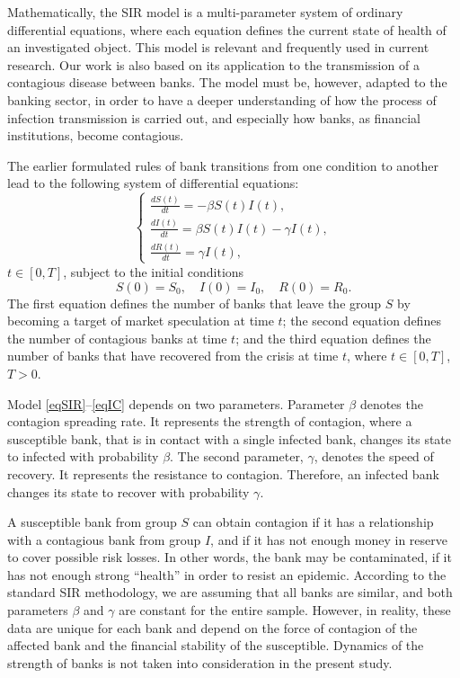 \documentclass[a4paper,10pt,twoside]{article}
\begin{document}
Mathematically, the SIR model is a multi-parameter system of ordinary differential equations,
where each equation defines the current state of health of an investigated object.
This model is relevant and frequently used in current research.
Our work is also based on its application to the transmission of a contagious disease between banks.
The model must be, however, adapted to the banking sector, 
in order to have a deeper understanding of how the process of infection transmission 
is carried out, and especially how banks, as financial institutions, become contagious.

The earlier formulated rules of bank transitions from one condition to another
lead to the following system of differential equations:
\begin{equation}
\label{eqSIR}
\begin{cases}
\displaystyle \frac{dS(t)}{dt} = - \beta S(t) I(t),\\[0.3cm]
\displaystyle \frac{dI(t)}{dt} = \beta S(t) I(t) - \gamma I(t),\\[0.3cm]
\displaystyle \frac{dR(t)}{dt} = \gamma I(t),
\end{cases}
\end{equation}
$t \in [0,T]$, subject to the initial conditions
\begin{equation}
\label{eqIC}
S(0) = S_0, \quad I(0) = I_0, \quad R(0) = R_0.
\end{equation}
The first equation defines the number of banks that leave the group $S$ 
by becoming a target of market speculation at time $t$; the second equation 
defines the number of contagious banks at time $t$; and the third equation 
defines the number of banks that have recovered from the crisis at time $t$, 
where $t\in [0,T]$, $T > 0$.

Model \eqref{eqSIR}--\eqref{eqIC} depends on two parameters. 
Parameter $\beta$ denotes the contagion spreading rate. 
It represents the strength of contagion, where a susceptible bank, 
that is in contact with a single infected bank, changes its state 
to infected with probability $\beta$. The second parameter, $\gamma$, 
denotes the speed of recovery. It represents the resistance to contagion. 
Therefore, an infected bank changes its state to recover with probability $\gamma$.

A susceptible bank from group $S$ can obtain contagion if it has a relationship 
with a contagious bank from group $I$, and if it has not enough money in reserve 
to cover possible risk losses. In other words, the bank may be contaminated, 
if it has not enough strong ``health'' in order to resist an epidemic. 
According to the standard SIR methodology, we are assuming that all banks are similar, 
and both parameters $\beta$ and $\gamma$ are constant for the entire sample. However, 
in reality, these data are unique for each bank and depend on the force of contagion 
of the affected bank and the financial stability of the susceptible. Dynamics of the 
strength of banks is not taken into consideration in the present study. 
\end{document}
